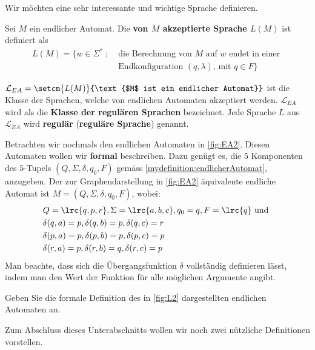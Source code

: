 Wir möchten eine sehr interessante und wichtige Sprache definieren.
\begin{mydefinition}\label{mydefinition:akzeptiereSpracheEA}
Sei $M$ ein endlicher Automat. Die \textbf{von $M$ akzeptierte Sprache $L(M)$} ist definiert als
\begin{equation*}
	\begin{split}
		L(M) =\{ w\in\Sigma^* \; ; \; & \text{die Berechnung von $M$ auf $w$ endet in einer }  \\
		                              & \text{Endkonfiguration $(q,\lambda)$, mit $q\in F$} \}
	\end{split}
\end{equation*}
\end{mydefinition}

\begin{mydefinition}\label{mydefinition:regulaereSprachen}
$\mathcal{L}_{EA} = \setcm{L(M)}{\text{$M$ ist ein endlicher Automat}}$ ist die Klasse der Sprachen, welche von endlichen Automaten akzeptiert werden. $\mathcal{L}_{EA}$ wird als die \textbf{Klasse der regulären Sprachen} bezeichnet. Jede Sprache $L$ aus $\mathcal{L}_{EA}$ wird \textbf{regulär} (\textbf{reguläre Sprache}) genannt.
\end{mydefinition}

Betrachten wir nochmals den endlichen Automaten in \cref{fig:EA2}. Diesen Automaten wollen wir \textbf{formal} beschreiben. Dazu genügt es, die $5$ Komponenten des $5$-Tupels $(Q,\Sigma, \delta, q_0, F)$ gemäss \cref{mydefinition:endlicherAutomat}, anzugeben. Der zur Graphendarstellung in \cref{fig:EA2} äquivalente endliche Automat  ist $M = (Q,\Sigma, \delta, q_0, F)$, wobei:
\begin{align*}
	 & Q = \lrc{q,p,r}, \Sigma = \lrc{a,b,c}, q_0 = q, F = \lrc{q}\text{ und } \\
	 & \delta(q,a) = p, \delta(q,b) = p, \delta(q,c) = r                       \\
	 & \delta(p,a) = p, \delta(p,b) = p, \delta(p,c) = p                       \\
	 & \delta(r,a) = p, \delta(r,b) = q, \delta(r,c) = p
\end{align*}
Man beachte, dass sich die Übergangsfunktion $\delta$ vollständig definieren lässt, indem man den Wert der Funktion für alle möglichen Argumente angibt.

\begin{myexercise}\label{myexercise:0404}
	Geben Sie die formale Definition des in \cref{fig:L2} dargestellten endlichen Automaten an.
\end{myexercise}
Zum Abschluss dieses Unterabschnitts wollen wir noch zwei nützliche Definitionen vorstellen.

